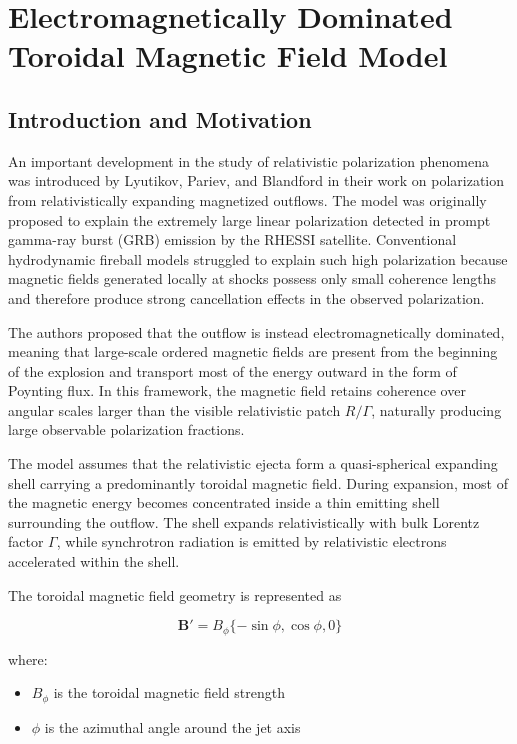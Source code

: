 \documentclass{article}
\begin{document}
\section{Electromagnetically Dominated Toroidal Magnetic Field Model}

\subsection{Introduction and Motivation}

An important development in the study of relativistic polarization phenomena was introduced by Lyutikov, Pariev, and Blandford in their work on polarization from relativistically expanding magnetized outflows. The model was originally proposed to explain the extremely large linear polarization detected in prompt gamma-ray burst (GRB) emission by the RHESSI satellite. Conventional hydrodynamic fireball models struggled to explain such high polarization because magnetic fields generated locally at shocks possess only small coherence lengths and therefore produce strong cancellation effects in the observed polarization.

The authors proposed that the outflow is instead electromagnetically dominated, meaning that large-scale ordered magnetic fields are present from the beginning of the explosion and transport most of the energy outward in the form of Poynting flux. In this framework, the magnetic field retains coherence over angular scales larger than the visible relativistic patch \(R/\Gamma\), naturally producing large observable polarization fractions.

The model assumes that the relativistic ejecta form a quasi-spherical expanding shell carrying a predominantly toroidal magnetic field. During expansion, most of the magnetic energy becomes concentrated inside a thin emitting shell surrounding the outflow. The shell expands relativistically with bulk Lorentz factor \(\Gamma\), while synchrotron radiation is emitted by relativistic electrons accelerated within the shell.

The toroidal magnetic field geometry is represented as

\begin{equation}
\mathbf{B}' = B_{\phi}\{-\sin\phi,\cos\phi,0\}
\end{equation}

where:
\begin{itemize}
    \item \(B_{\phi}\) is the toroidal magnetic field strength
    \item \(\phi\) is the azimuthal angle around the jet axis
\end{itemize}
\end{document}
